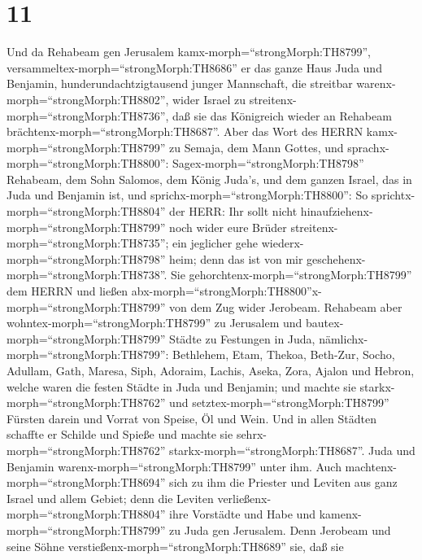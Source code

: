 \hypertarget{section-10}{%
\section{11}\label{section-10}}

 Und da Rehabeam gen Jerusalem
kamx-morph=``strongMorph:TH8799'',
versammeltex-morph=``strongMorph:TH8686'' er das ganze Haus Juda und
Benjamin, hunderundachtzigtausend junger Mannschaft, die streitbar
warenx-morph=``strongMorph:TH8802'', wider Israel zu
streitenx-morph=``strongMorph:TH8736'', daß sie das Königreich wieder an
Rehabeam brächtenx-morph=``strongMorph:TH8687''.  Aber das
Wort des HERRN kamx-morph=``strongMorph:TH8799'' zu Semaja, dem Mann
Gottes, und sprachx-morph=``strongMorph:TH8800'': 
Sagex-morph=``strongMorph:TH8798'' Rehabeam, dem Sohn Salomos, dem König
Juda's, und dem ganzen Israel, das in Juda und Benjamin ist, und
sprichx-morph=``strongMorph:TH8800'':  So
sprichtx-morph=``strongMorph:TH8804'' der HERR: Ihr sollt nicht
hinaufziehenx-morph=``strongMorph:TH8799'' noch wider eure Brüder
streitenx-morph=``strongMorph:TH8735''; ein jeglicher gehe
wiederx-morph=``strongMorph:TH8798'' heim; denn das ist von mir
geschehenx-morph=``strongMorph:TH8738''. Sie
gehorchtenx-morph=``strongMorph:TH8799'' dem HERRN und ließen
abx-morph=``strongMorph:TH8800''x-morph=``strongMorph:TH8799'' von dem
Zug wider Jerobeam.  Rehabeam aber
wohntex-morph=``strongMorph:TH8799'' zu Jerusalem und
bautex-morph=``strongMorph:TH8799'' Städte zu Festungen in Juda,
 nämlichx-morph=``strongMorph:TH8799'': Bethlehem, Etam,
Thekoa,  Beth-Zur, Socho, Adullam,  Gath,
Maresa, Siph,  Adoraim, Lachis, Aseka,  Zora,
Ajalon und Hebron, welche waren die festen Städte in Juda und Benjamin;
 und machte sie starkx-morph=``strongMorph:TH8762'' und
setztex-morph=``strongMorph:TH8799'' Fürsten darein und Vorrat von
Speise, Öl und Wein.  Und in allen Städten schaffte er
Schilde und Spieße und machte sie sehrx-morph=``strongMorph:TH8762''
starkx-morph=``strongMorph:TH8687''. Juda und Benjamin
warenx-morph=``strongMorph:TH8799'' unter ihm.  Auch
machtenx-morph=``strongMorph:TH8694'' sich zu ihm die Priester und
Leviten aus ganz Israel und allem Gebiet;  denn die Leviten
verließenx-morph=``strongMorph:TH8804'' ihre Vorstädte und Habe und
kamenx-morph=``strongMorph:TH8799'' zu Juda gen Jerusalem. Denn Jerobeam
und seine Söhne verstießenx-morph=``strongMorph:TH8689'' sie, daß sie
